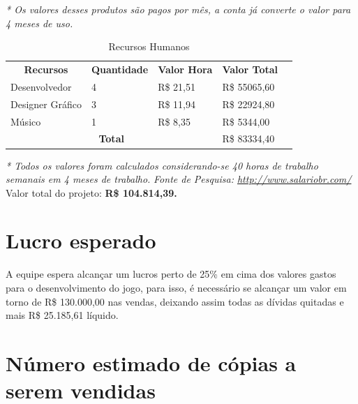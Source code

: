 \documentclass[11pt]{article} %
\begin{document}
\textit{* Os valores desses produtos são pagos por mês, a conta já converte o valor para 4 meses de uso.}
\newpage

\begin{table}[h]
\begin{tabular}{|l|l|l|l|l}
\cline{1-4}
\multicolumn{1}{|c|}{\textbf{Recursos}} & \multicolumn{1}{c|}{\textbf{Quantidade}} & \multicolumn{1}{c|}{\textbf{Valor Hora}} & \multicolumn{1}{c|}{\textbf{Valor Total}} &  \\ \cline{1-4}
Desenvolvedor                           & 4                                        & R\$ 21,51                                & R\$ 55065,60                              &  \\ \cline{1-4}
Designer Gráfico                        & 3                                        & R\$ 11,94                                & R\$ 22924,80                              &  \\ \cline{1-4}
Músico                                  & 1                                        & R\$ 8,35                                 & R\$ 5344,00                               &  \\ \cline{1-4}
\multicolumn{3}{|c|}{\textbf{Total}}                                                                                          & R\$ 83334,40                              &  \\ \cline{1-4}
\end{tabular}
\caption {Recursos Humanos}
\end{table}

\textit{* Todos os valores foram calculados considerando-se 40 horas de trabalho semanais em 4 meses de trabalho.}
\textit{Fonte de Pesquisa: \url{http://www.salariobr.com/}}
\\

Valor total do projeto: {\textbf{R\$ 104.814,39.}}

\section{Lucro esperado}

A equipe espera alcançar um lucros perto de 25\% em cima dos valores gastos para o desenvolvimento do jogo, para isso, é necessário se alcançar um valor em torno de R\$ 130.000,00 nas vendas, deixando assim todas as dívidas quitadas e mais R\$ 25.185,61 líquido.

\section{Número estimado de cópias a serem vendidas}
\end{document}
